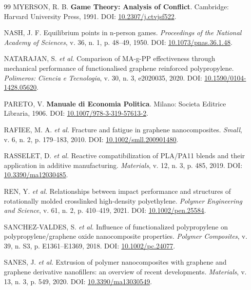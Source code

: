 \documentclass[11pt,a4paper,oneside]{article}
\begin{document}
\begin{thebibliography}{99}
 MYERSON, R. B. \textbf{Game Theory: Analysis of Conflict}. Cambridge: Harvard University Press, 1991. DOI: \href{https://doi.org/10.2307/j.ctvjsf522}{10.2307/j.ctvjsf522}.

 NASH, J. F. Equilibrium points in n-person games. \textit{Proceedings of the National Academy of Sciences}, v. 36, n. 1, p. 48--49, 1950. DOI: \href{https://doi.org/10.1073/pnas.36.1.48}{10.1073/pnas.36.1.48}.

 NATARAJAN, S. \textit{et al.} Comparison of MA-g-PP effectiveness through mechanical performance of functionalised graphene reinforced polypropylene. \textit{Polimeros: Ciencia e Tecnologia}, v. 30, n. 3, e2020035, 2020. DOI: \href{https://doi.org/10.1590/0104-1428.05620}{10.1590/0104-1428.05620}.

 PARETO, V. \textbf{Manuale di Economia Politica}. Milano: Societa Editrice Libraria, 1906. DOI: \href{https://doi.org/10.1007/978-3-319-57613-2}{10.1007/978-3-319-57613-2}.

 RAFIEE, M. A. \textit{et al.} Fracture and fatigue in graphene nanocomposites. \textit{Small}, v. 6, n. 2, p. 179--183, 2010. DOI: \href{https://doi.org/10.1002/smll.200901480}{10.1002/smll.200901480}.

 RASSELET, D. \textit{et al.} Reactive compatibilization of PLA/PA11 blends and their application in additive manufacturing. \textit{Materials}, v. 12, n. 3, p. 485, 2019. DOI: \href{https://doi.org/10.3390/ma12030485}{10.3390/ma12030485}.

 REN, Y. \textit{et al.} Relationships between impact performance and structures of rotationally molded crosslinked high-density polyethylene. \textit{Polymer Engineering and Science}, v. 61, n. 2, p. 410--419, 2021. DOI: \href{https://doi.org/10.1002/pen.25584}{10.1002/pen.25584}.

 SANCHEZ-VALDES, S. \textit{et al.} Influence of functionalized polypropylene on polypropylene/graphene oxide nanocomposite properties. \textit{Polymer Composites}, v. 39, n. S3, p. E1361--E1369, 2018. DOI: \href{https://doi.org/10.1002/pc.24077}{10.1002/pc.24077}.

 SANES, J. \textit{et al.} Extrusion of polymer nanocomposites with graphene and graphene derivative nanofillers: an overview of recent developments. \textit{Materials}, v. 13, n. 3, p. 549, 2020. DOI: \href{https://doi.org/10.3390/ma13030549}{10.3390/ma13030549}.


\end{thebibliography}
\end{document}
